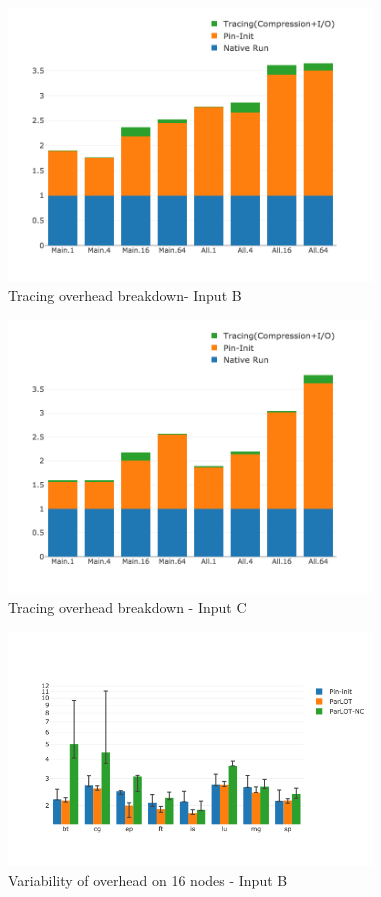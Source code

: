 \begin{figure}[t]
\centering
\includegraphics[width=3.8in]{figs.comet.newMed/comet_chartDet_B_wc_byTool_p3_5.png}
\caption{ Tracing overhead breakdown- Input B}
\label{comet_chartDet_B_wc_byTool_p3_5}
\end{figure}


\begin{figure}[t]
\centering
\includegraphics[width=3.8in]{figs.comet.newMed/comet_chartDet_C_wc_byTool_p3_5.png}
\caption{ Tracing overhead breakdown - Input C}
\label{comet_chartDet_C_wc_byTool_p3_5}
\end{figure}



\begin{figure}[t]
\centering
\includegraphics[width=3.8in]{figs.comet.newMed/comet_BX2_Main_16_B_p3_5.png}
\caption{ Variability of \parlotm overhead on 16 nodes - Input B}
\label{comet_BX2_Main_16_B_p3_5}
\end{figure}
  
